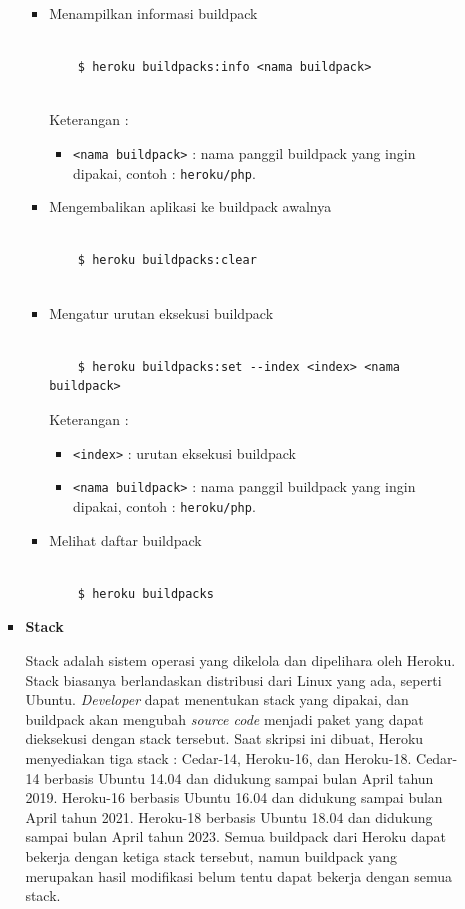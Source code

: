 \documentclass[a4paper,twoside]{article}
\begin{document}
\begin{enumerate}
\begin{enumerate}
\begin{itemize}
\begin{itemize}
\item Menampilkan informasi buildpack

\begin{lstlisting}

	$ heroku buildpacks:info <nama buildpack>
	
\end{lstlisting}
Keterangan :
\begin{itemize}
\item \texttt{<nama buildpack>} : nama panggil buildpack yang ingin dipakai, contoh : \texttt{heroku/php}.
\end{itemize}

\item Mengembalikan aplikasi ke buildpack awalnya

\begin{lstlisting}

	$ heroku buildpacks:clear
	
\end{lstlisting}

\item Mengatur urutan eksekusi buildpack

\begin{lstlisting}

	$ heroku buildpacks:set --index <index> <nama buildpack>

\end{lstlisting}
Keterangan :
\begin{itemize}
\item \texttt{<index>} : urutan eksekusi buildpack
\item \texttt{<nama buildpack>} : nama panggil buildpack yang ingin dipakai, contoh : \texttt{heroku/php}.
\end{itemize}

\item Melihat daftar buildpack

\begin{lstlisting}

	$ heroku buildpacks

\end{lstlisting}

\end{itemize}
		
				\item \textbf{Stack}
		
				Stack adalah sistem operasi yang dikelola dan dipelihara oleh Heroku. Stack biasanya berlandaskan distribusi dari Linux yang ada, seperti Ubuntu. \textit{Developer} dapat menentukan stack yang dipakai, dan buildpack akan mengubah \textit{source code} menjadi paket yang dapat dieksekusi dengan stack tersebut. Saat skripsi ini dibuat, Heroku menyediakan tiga stack : Cedar-14, Heroku-16, dan Heroku-18. Cedar-14 berbasis Ubuntu 14.04 dan didukung sampai bulan April tahun 2019. Heroku-16 berbasis Ubuntu 16.04 dan didukung sampai bulan April tahun 2021. Heroku-18 berbasis Ubuntu 18.04 dan didukung sampai bulan April tahun 2023. Semua buildpack dari Heroku dapat bekerja dengan ketiga stack tersebut, namun buildpack yang merupakan hasil modifikasi belum tentu dapat bekerja dengan semua stack.


\end{itemize}
\end{enumerate}
\end{enumerate}
\end{document}
